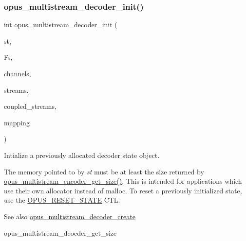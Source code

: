 \subsubsection{\texorpdfstring{opus\+\_\+multistream\+\_\+decoder\+\_\+init()}{opus\_multistream\_decoder\_init()}}
{\footnotesize\ttfamily int opus\+\_\+multistream\+\_\+decoder\+\_\+init (\begin{DoxyParamCaption}\item[{\hyperlink{group__opus__multistream_gad3497495deb9a8ace82e76cd4f93e0e4}{Opus\+M\+S\+Decoder} $\ast$}]{st,  }\item[{\hyperlink{opus__types_8h_aa4d309d6f80b99dbabebc8f98879ab9a}{opus\+\_\+int32}}]{Fs,  }\item[{int}]{channels,  }\item[{int}]{streams,  }\item[{int}]{coupled\+\_\+streams,  }\item[{const unsigned char $\ast$}]{mapping }\end{DoxyParamCaption})}



Intialize a previously allocated decoder state object. 

The memory pointed to by {\itshape st} must be at least the size returned by \hyperlink{group__opus__multistream_ga8642aa9cf16115229a655574d832293b}{opus\+\_\+multistream\+\_\+encoder\+\_\+get\+\_\+size()}. This is intended for applications which use their own allocator instead of malloc. To reset a previously initialized state, use the \hyperlink{group__opus__genericctls_gadc74e4fa8bcdf9994187d52d92207337}{O\+P\+U\+S\+\_\+\+R\+E\+S\+E\+T\+\_\+\+S\+T\+A\+TE} C\+TL. \begin{DoxySeeAlso}{See also}
\hyperlink{group__opus__multistream_ga3c0e342774174c471e61cedba53755c9}{opus\+\_\+multistream\+\_\+decoder\+\_\+create} 

opus\+\_\+multistream\+\_\+deocder\+\_\+get\+\_\+size 
\end{DoxySeeAlso}

